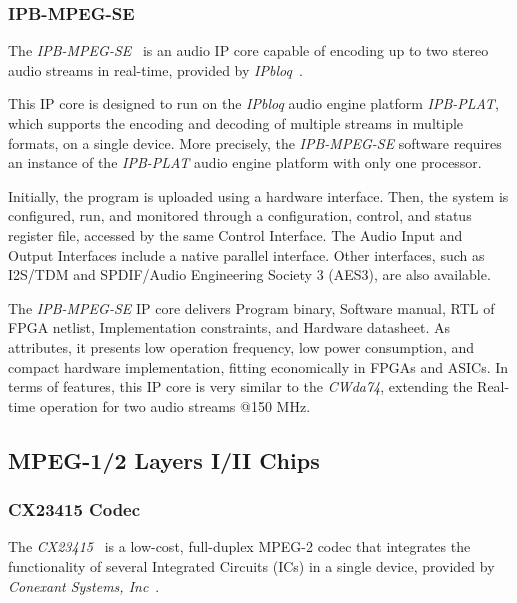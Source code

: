 \vspace{0.3cm}

\subsubsection{IPB-MPEG-SE}

The \textit{IPB-MPEG-SE}~\cite{ipb-mpeg-se} is an audio IP core capable of encoding up to two stereo audio streams in real-time, provided by \textit{IPbloq}~\cite{bib:ipbloq}.

This IP core is designed to run on the \textit{IPbloq} audio engine platform \textit{IPB-PLAT}, which supports the encoding and decoding of multiple streams in multiple formats, on a single device. More precisely, the \textit{IPB-MPEG-SE} software requires an instance of the \textit{IPB-PLAT} audio engine platform with only one processor. 

Initially, the program is uploaded using a hardware interface. Then, the system is configured, run, and monitored through a configuration, control, and status register file, accessed by the same Control Interface.
The Audio Input and Output Interfaces include a native parallel interface. Other interfaces, such as I2S/TDM and SPDIF/Audio Engineering Society 3 (AES3), are also available.

The \textit{IPB-MPEG-SE} IP core delivers Program binary, Software manual, RTL of FPGA netlist, Implementation constraints, and Hardware datasheet. 
As attributes, it presents low operation frequency, low power consumption, and compact hardware implementation, fitting economically in FPGAs and ASICs.
In terms of features, this IP core is very similar to the \textit{CWda74}, extending the Real-time operation for two audio streams @150 MHz. 


\subsection{MPEG-1/2 Layers I/II Chips}

\subsubsection{CX23415 Codec}

The \textit{CX23415}~\cite{cx23415} is a low-cost, full-duplex MPEG-2 codec that integrates the functionality of several Integrated Circuits (ICs) in a single device, provided by \textit{Conexant Systems, Inc}~\cite{bib:conexant}.

